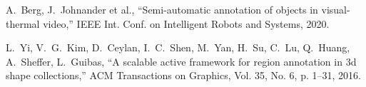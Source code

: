 \begin{thebibliography}{99}

    A.~Berg, J.~Johnander et al., “Semi-automatic annotation of objects in visual-thermal video,” IEEE Int. Conf. on Intelligent Robots and Systems, 2020.
    
    L.~Yi, V.~G.~Kim, D.~Ceylan, I.~C.~Shen, M.~Yan, H.~Su, C.~Lu,
    Q.~Huang, A.~Sheffer, L.~Guibas, “A scalable active framework for region annotation in 3d shape collections,” ACM Transactions on Graphics, Vol. 35, No. 6, p. 1–31, 2016.

\end{thebibliography}